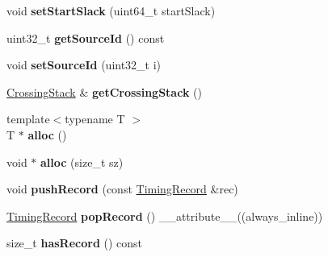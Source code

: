 \begin{DoxyCompactItemize}
\item 
\hypertarget{classEventRecorder_a4a5078b32b484226d921538054fee4e8}{void {\bfseries set\-Start\-Slack} (uint64\-\_\-t start\-Slack)}\label{classEventRecorder_a4a5078b32b484226d921538054fee4e8}

\item 
\hypertarget{classEventRecorder_a825338b237bcd7ae9f7f65477a489a6f}{uint32\-\_\-t {\bfseries get\-Source\-Id} () const }\label{classEventRecorder_a825338b237bcd7ae9f7f65477a489a6f}

\item 
\hypertarget{classEventRecorder_a9c079787b3c2284d1defde04be45446f}{void {\bfseries set\-Source\-Id} (uint32\-\_\-t i)}\label{classEventRecorder_a9c079787b3c2284d1defde04be45446f}

\item 
\hypertarget{classEventRecorder_a37ec484c1773fbbb837c0ed5cf37acab}{\hyperlink{classg__vector}{Crossing\-Stack} \& {\bfseries get\-Crossing\-Stack} ()}\label{classEventRecorder_a37ec484c1773fbbb837c0ed5cf37acab}

\item 
\hypertarget{classEventRecorder_a159f84907e26da94afefa727d0237305}{{\footnotesize template$<$typename T $>$ }\\T $\ast$ {\bfseries alloc} ()}\label{classEventRecorder_a159f84907e26da94afefa727d0237305}

\item 
\hypertarget{classEventRecorder_a41c38d3c5d52714385b52d276c2c1aa3}{void $\ast$ {\bfseries alloc} (size\-\_\-t sz)}\label{classEventRecorder_a41c38d3c5d52714385b52d276c2c1aa3}

\item 
\hypertarget{classEventRecorder_afc30252e62f21bc42a05eae12db00b70}{void {\bfseries push\-Record} (const \hyperlink{structTimingRecord}{Timing\-Record} \&rec)}\label{classEventRecorder_afc30252e62f21bc42a05eae12db00b70}

\item 
\hypertarget{classEventRecorder_a4a79087d8409e82b3b41fd2e4b5ecdef}{\hyperlink{structTimingRecord}{Timing\-Record} {\bfseries pop\-Record} () \-\_\-\-\_\-attribute\-\_\-\-\_\-((always\-\_\-inline))}\label{classEventRecorder_a4a79087d8409e82b3b41fd2e4b5ecdef}

\item 
\hypertarget{classEventRecorder_a335b5de4de0e0144d7829f8c75279f32}{size\-\_\-t {\bfseries has\-Record} () const }\label{classEventRecorder_a335b5de4de0e0144d7829f8c75279f32}


\end{DoxyCompactItemize}
